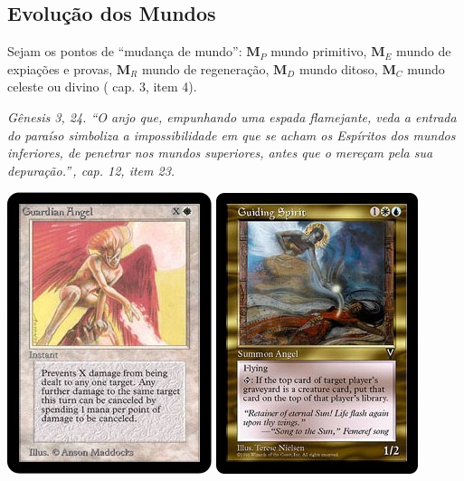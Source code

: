 \documentclass[12pt,a4paper]{article}
\begin{document}
		\subsection {Evolu\c{c}\~ao dos Mundos}
			\begin{flushright}
			\end{flushright}

			Sejam os pontos de \textquotedblleft mudan\c{c}a de mundo\textquotedblright: $ \mathbf{M}_P $ mundo primitivo, $ \mathbf{M}_E $ mundo de expia\c{c}\~oes e provas, $ \mathbf{M}_R $ mundo de regenera\c{c}\~ao, $ \mathbf{M}_D $ mundo ditoso, $ \mathbf{M}_C $ mundo celeste ou divino (\cite{ese} cap. 3, item 4).

			\emph{G\^enesis 3, 24. \textquotedblleft O anjo que, empunhando uma espada flamejante, veda a entrada do para\'iso simboliza a impossibilidade\cite{possibilidades} em que se acham os Esp\'iritos dos mundos inferiores, de penetrar nos mundos superiores, antes que o mere\c{c}am pela sua depura\c{c}\~ao.\textquotedblright\,\cite{genese}, cap. 12, item 23.}

			\begin{center}
			\includegraphics{angel} \includegraphics{guiding}
			\end{center}
\end{document}
